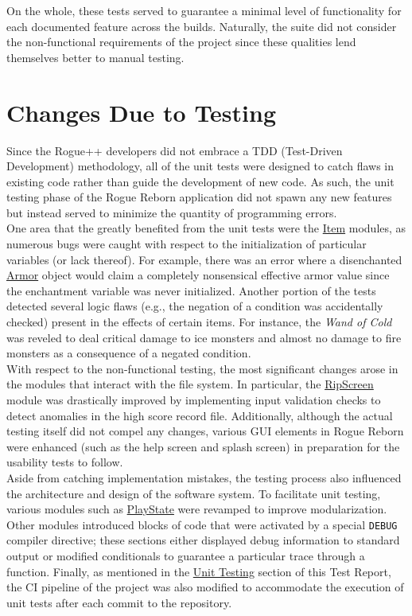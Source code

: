 \documentclass[12pt, titlepage]{article}
\newcommand{\newsection}[1]{\newpage\section{#1}}
\begin{document}
	On the whole, these tests served to guarantee a minimal level of functionality for each documented feature across the builds.  Naturally, the suite did not consider the non-functional requirements of the project since these qualities lend themselves better to manual testing.  

\newsection{Changes Due to Testing} \label{Section_Changes}
	Since the Rogue++ developers did not embrace a TDD (Test-Driven Development) methodology, all of the unit tests were designed to catch flaws in existing code rather than guide the development of new code.  As such, the  unit testing phase of the Rogue Reborn application did not spawn any new features but instead served to minimize the quantity of programming errors.\\

	One area that the greatly benefited from the unit tests were the \hyperref[Section_M_Trace]{Item} modules, as numerous bugs were caught with respect to the initialization of particular variables (or lack thereof).  For example, there was an error where a disenchanted \hyperref[Section_M_Trace]{Armor} object would claim a completely nonsensical effective armor value since the enchantment variable was never initialized.  Another portion of the tests detected several logic flaws (e.g., the negation of a condition was accidentally checked) present in the effects of certain items.  For instance, the \textit{Wand of Cold} was reveled to deal critical damage to ice monsters and almost no damage to fire monsters as a consequence of a negated condition.\\

	With respect to the non-functional testing, the most significant changes arose in the modules that interact with the file system.  In particular, the \hyperref[Section_M_Trace]{RipScreen} module was drastically improved by implementing input validation checks to detect anomalies in the high score record file.  Additionally, although the actual testing itself did not compel any changes, various GUI elements in Rogue Reborn were enhanced (such as the help screen and splash screen) in preparation for the usability tests to follow.\\

	Aside from catching implementation mistakes, the testing process also influenced the architecture and design of the software system.  To facilitate unit testing, various modules such as \hyperref[Section_M_Trace]{PlayState} were revamped to improve modularization.  Other modules introduced blocks of code that were activated by a special \lstinline$DEBUG$ compiler directive; these sections either displayed debug information to standard output or modified conditionals to guarantee a particular trace through a function.  Finally, as mentioned in the \hyperref[Section_UT]{Unit Testing} section of this Test Report, the CI pipeline of the project was also modified to accommodate the execution of unit tests after each commit to the repository.
\end{document}
